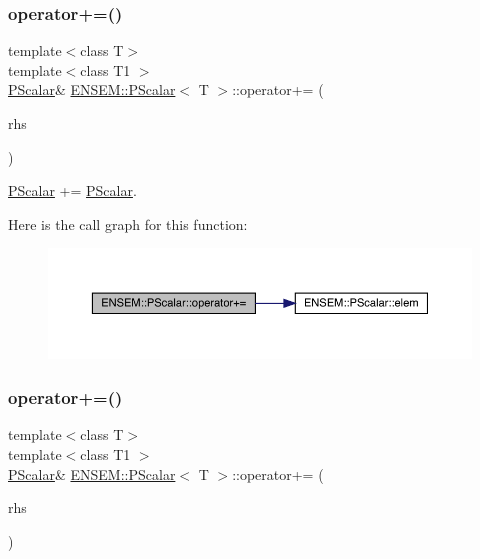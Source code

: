 \subsubsection{\texorpdfstring{operator+=()}{operator+=()}\hspace{0.1cm}{\footnotesize\ttfamily [2/3]}}
{\footnotesize\ttfamily template$<$class T$>$ \\
template$<$class T1 $>$ \\
\mbox{\hyperlink{classENSEM_1_1PScalar}{P\+Scalar}}\& \mbox{\hyperlink{classENSEM_1_1PScalar}{E\+N\+S\+E\+M\+::\+P\+Scalar}}$<$ T $>$\+::operator+= (\begin{DoxyParamCaption}\item[{const \mbox{\hyperlink{classENSEM_1_1PScalar}{P\+Scalar}}$<$ T1 $>$ \&}]{rhs }\end{DoxyParamCaption})\hspace{0.3cm}{\ttfamily [inline]}}



\mbox{\hyperlink{classENSEM_1_1PScalar}{P\+Scalar}} += \mbox{\hyperlink{classENSEM_1_1PScalar}{P\+Scalar}}. 

Here is the call graph for this function\+:
\nopagebreak
\begin{figure}[H]
\begin{center}
\leavevmode
\includegraphics[width=350pt]{d3/d27/classENSEM_1_1PScalar_a9c8d9e51f9d0a13b4b4aa9992812eea8_cgraph}
\end{center}
\end{figure}
\mbox{\label{classENSEM_1_1PScalar_a9c8d9e51f9d0a13b4b4aa9992812eea8}} 
\subsubsection{\texorpdfstring{operator+=()}{operator+=()}\hspace{0.1cm}{\footnotesize\ttfamily [3/3]}}
{\footnotesize\ttfamily template$<$class T$>$ \\
template$<$class T1 $>$ \\
\mbox{\hyperlink{classENSEM_1_1PScalar}{P\+Scalar}}\& \mbox{\hyperlink{classENSEM_1_1PScalar}{E\+N\+S\+E\+M\+::\+P\+Scalar}}$<$ T $>$\+::operator+= (\begin{DoxyParamCaption}\item[{const \mbox{\hyperlink{classENSEM_1_1PScalar}{P\+Scalar}}$<$ T1 $>$ \&}]{rhs }\end{DoxyParamCaption})\hspace{0.3cm}{\ttfamily [inline]}}



